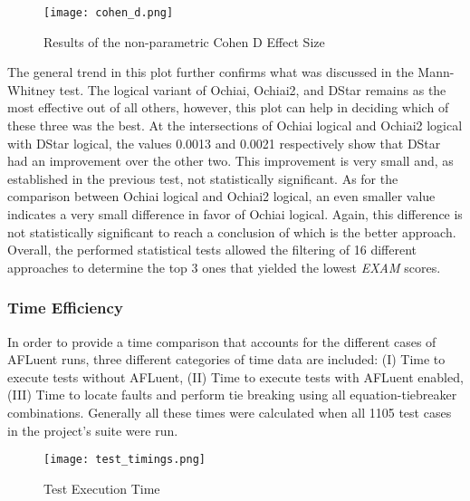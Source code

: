 \begin{figure}[!htb]
	\begin{center}
		\texttt{[image: cohen\_d.png]}
        \caption{\label{fig:cohen_d} Results of the non-parametric Cohen D
        Effect Size}
	\end{center}
\end{figure}

The general trend in this plot further confirms what was discussed in the
Mann-Whitney test. The logical variant of Ochiai, Ochiai2, and DStar remains as
the most effective out of all others, however, this plot can help in deciding
which of these three was the best. At the intersections of Ochiai logical and
Ochiai2 logical with DStar logical, the values 0.0013 and 0.0021 respectively
show that DStar had an improvement over the other two. This improvement is very
small and, as established in the previous test, not statistically significant.
As for the comparison between Ochiai logical and Ochiai2 logical, an even
smaller value indicates a very small difference in favor of Ochiai logical.
Again, this difference is not statistically significant to reach a conclusion of
which is the better approach. Overall, the performed statistical tests allowed
the filtering of 16 different approaches to determine the top 3 ones that
yielded the lowest \emph{EXAM} scores.

\subsubsection{Time Efficiency}
\label{subsubsec:time_Efficiency}

In order to provide a time comparison that accounts for the different cases of
AFLuent runs, three different categories of time data are included: (I) Time to
execute tests without AFLuent, (II) Time to execute tests with AFLuent enabled,
(III) Time to locate faults and perform tie breaking using all
equation-tiebreaker combinations. Generally all these times were calculated when
all 1105 test cases in the project's suite were run.

\begin{figure}[!htb]
	\begin{center}
		\texttt{[image: test\_timings.png]}
		\caption{\label{fig:test_timings} Test Execution Time}
	\end{center}
\end{figure}

